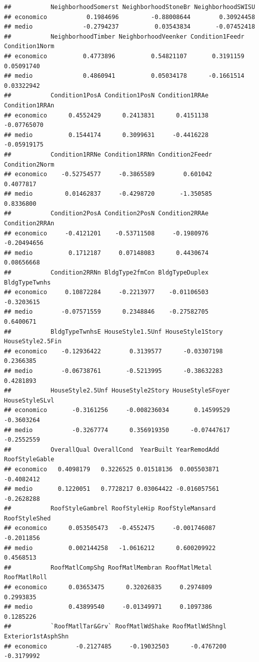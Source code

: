 \documentclass[
]{article}
\begin{document}
\begin{verbatim}
##           NeighborhoodSomerst NeighborhoodStoneBr NeighborhoodSWISU
## economico           0.1984696         -0.88008644        0.30924458
## medio              -0.2794237          0.03543834       -0.07452418
##           NeighborhoodTimber NeighborhoodVeenker Condition1Feedr Condition1Norm
## economico          0.4773896          0.54821107       0.3191159     0.05091740
## medio              0.4860941          0.05034178      -0.1661514     0.03322942
##           Condition1PosA Condition1PosN Condition1RRAe Condition1RRAn
## economico      0.4552429      0.2413831      0.4151138    -0.07765070
## medio          0.1544174      0.3099631     -0.4416228    -0.05919175
##           Condition1RRNe Condition1RRNn Condition2Feedr Condition2Norm
## economico    -0.52754577     -0.3865589        0.601042      0.4077817
## medio         0.01462837     -0.4298720       -1.350585      0.8336800
##           Condition2PosA Condition2PosN Condition2RRAe Condition2RRAn
## economico     -0.4121201    -0.53711508     -0.1980976    -0.20494656
## medio          0.1712187     0.07148083      0.4430674     0.08656668
##           Condition2RRNn BldgType2fmCon BldgTypeDuplex BldgTypeTwnhs
## economico     0.10872284     -0.2213977    -0.01106503    -0.3203615
## medio        -0.07571559      0.2348846    -0.27582705     0.6400671
##           BldgTypeTwnhsE HouseStyle1.5Unf HouseStyle1Story HouseStyle2.5Fin
## economico    -0.12936422        0.3139577      -0.03307198        0.2366385
## medio        -0.06738761       -0.5213995      -0.38632283        0.4281893
##           HouseStyle2.5Unf HouseStyle2Story HouseStyleSFoyer HouseStyleSLvl
## economico       -0.3161256     -0.008236034       0.14599529     -0.3603264
## medio           -0.3267774      0.356919350      -0.07447617     -0.2552559
##           OverallQual OverallCond  YearBuilt YearRemodAdd RoofStyleGable
## economico   0.4098179   0.3226525 0.01518136  0.005503871     -0.4082412
## medio       0.1220051   0.7728217 0.03064422 -0.016057561     -0.2628288
##           RoofStyleGambrel RoofStyleHip RoofStyleMansard RoofStyleShed
## economico      0.053505473   -0.4552475     -0.001746087    -0.2011856
## medio          0.002144258   -1.0616212      0.600209922     0.4568513
##           RoofMatlCompShg RoofMatlMembran RoofMatlMetal RoofMatlRoll
## economico      0.03653475      0.32026835     0.2974809    0.2993835
## medio          0.43899540     -0.01349971     0.1097386    0.1285226
##           `RoofMatlTar&Grv` RoofMatlWdShake RoofMatlWdShngl Exterior1stAsphShn
## economico        -0.2127485     -0.19032503      -0.4767200         -0.3179992

\end{verbatim}
\end{document}
